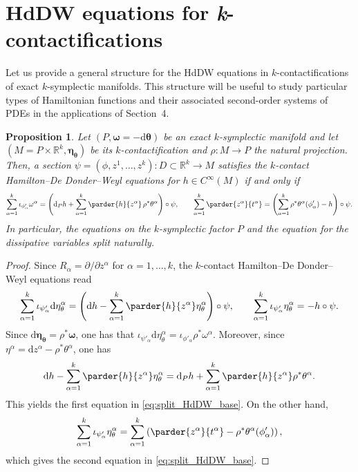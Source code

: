 \documentclass[11pt,a4paper]{article}
\newcommand{\dd}{\mathrm{d}}
\theoremstyle{plain} \newtheorem{theorem}{Theorem}[section] \newtheorem{proposition}[theorem]{Proposition} \newtheorem{corollary}[theorem]{Corollary} \newtheorem{lemma}[theorem]{Lemma} \theoremstyle{definition} \newtheorem{definition}[theorem]{Definition} \theoremstyle{remark} \newtheorem{remark}[theorem]{Remark} \newtheorem{example}[theorem]{Example} %
\begin{document}
\section{HdDW equations for {\it k}-contactifications}
\label{sec:tools_apps}
Let us provide a general structure for the HdDW equations in $k$-contactifications of exact $k$-symplectic manifolds. This structure will be useful to study particular types of Hamiltonian functions and their associated second-order systems of PDEs in the applications of Section~4.

\begin{proposition}\label{prop:split_HdDW_contactification}
Let \((P,\bm\omega=-\dd \bm\theta)\) be an exact \(k\)-symplectic manifold and let \((M=P\times\mathbb R^k,\bm\eta_{\bm\theta})\) be its \(k\)-contactification and $\rho:M\rightarrow P$ the natural projection. Then, a section \(\psi=(\phi,z^1,\dots,z^k)\colon D\subset\mathbb R^k\to M\) satisfies the \(k\)-contact Hamilton--De Donder--Weyl equations for \(h\in C^\infty(M)\) if and only if
\begin{equation}\label{eq:split_HdDW_base}
\sum_{\alpha=1}^k \iota_{\phi'_\alpha}\omega^\alpha=\left(\dd_P h+\sum_{\alpha=1}^k \parder{h}{z^\alpha}\,\rho^*\theta^\alpha\right)\circ\psi,\qquad 
\sum_{\alpha=1}^k \parder{z^\alpha}{t^\alpha}=\left(\sum_{\alpha=1}^k\rho^*\theta^\alpha(\phi'_\alpha)-h\right)\circ\psi.
\end{equation}
In particular, the equations on the \(k\)-symplectic factor \(P\) and the equation for the dissipative variables split naturally.
\end{proposition}

\begin{proof}
Since \(R_\alpha=\partial/\partial z^\alpha\) for $\alpha=1,\ldots,k$, the \(k\)-contact Hamilton--De Donder--Weyl equations read
\[
\sum_{\alpha=1}^k \iota_{\psi'_\alpha}\dd\eta_\theta^\alpha=\left(\dd h-\sum_{\alpha=1}^k \parder{h}{z^\alpha}\eta_\theta^\alpha\right)\circ\psi,\qquad
\sum_{\alpha=1}^k \iota_{\psi'_\alpha}\eta_\theta^\alpha=-h\circ\psi.
\]
Since \(\dd{\bm \eta}_{\bm\theta}=\rho^*\bm \omega\), one has that \(\iota_{\psi'_\alpha}\dd\eta_{\theta}^\alpha=\iota_{\phi'_\alpha}\rho^*\omega^\alpha\). Moreover, since \(\eta^\alpha=\dd z^\alpha-\rho^*\theta^\alpha\), one has
\[
\dd h-\sum_{\alpha=1}^k \parder{h}{z^\alpha}\eta_\theta^\alpha=\dd_P h+\sum_{\alpha=1}^k \parder{h}{z^\alpha}\rho^*\theta^\alpha.
\]
This yields the first equation in \eqref{eq:split_HdDW_base}. On the other hand,
\[
\sum_{\alpha=1}^k \iota_{\psi'_\alpha}\eta_\theta^\alpha=\sum_{\alpha=1}^k\left(\parder{z^\alpha}{t^\alpha}-\rho^*\theta^\alpha(\phi'_\alpha)\right),
\]
which gives the second equation in \eqref{eq:split_HdDW_base}. 
\end{proof}
\end{document}
